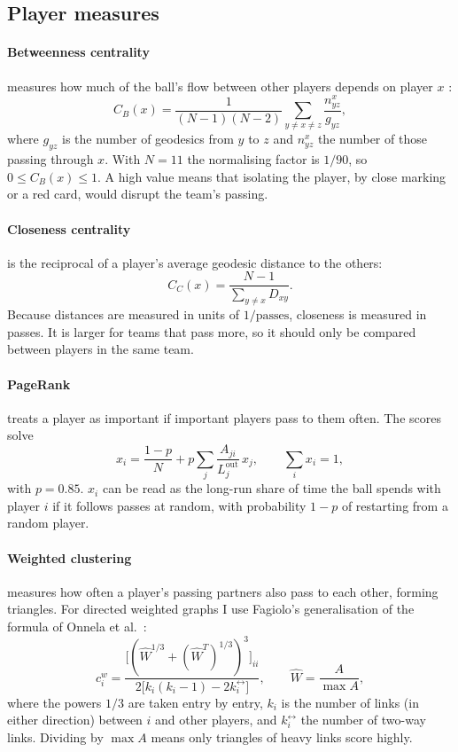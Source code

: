 \documentclass[11pt,a4paper]{article}
\begin{document}
\subsection{Player measures}\label{sec:measures}

\paragraph{Betweenness centrality} measures how much of the ball's flow between other players depends on player $x$ \cite{freeman, brandes}:
\[
C_B(x) = \frac{1}{(N-1)(N-2)} \sum_{y \ne x \ne z} \frac{n^x_{yz}}{g_{yz}},
\]
where $g_{yz}$ is the number of geodesics from $y$ to $z$ and $n^x_{yz}$ the number of those passing through $x$. With $N = 11$ the normalising factor is $1/90$, so $0 \le C_B(x) \le 1$. A high value means that isolating the player, by close marking or a red card, would disrupt the team's passing.

\paragraph{Closeness centrality} is the reciprocal of a player's average geodesic distance to the others:
\[
C_C(x) = \frac{N-1}{\sum_{y \ne x} D_{xy}} .
\]
Because distances are measured in units of $1/\text{passes}$, closeness is measured in passes. It is larger for teams that pass more, so it should only be compared between players in the same team.

\paragraph{PageRank} \cite{brin} treats a player as important if important players pass to them often. The scores solve
\[
x_i = \frac{1-p}{N} + p \sum_{j} \frac{A_{ji}}{L^{\text{out}}_j}\, x_j , \qquad \sum_i x_i = 1,
\]
with $p = 0.85$. $x_i$ can be read as the long-run share of time the ball spends with player $i$ if it follows passes at random, with probability $1-p$ of restarting from a random player.

\paragraph{Weighted clustering} measures how often a player's passing partners also pass to each other, forming triangles. For directed weighted graphs I use Fagiolo's generalisation \cite{fagiolo} of the formula of Onnela et al.\ \cite{onnela}:
\[
c^w_i = \frac{\big[(\hat W^{1/3} + (\hat W^{T})^{1/3})^3\big]_{ii}}{2\big[k_i(k_i-1) - 2k^{\leftrightarrow}_i\big]}, \qquad \hat W = \frac{A}{\max A},
\]
where the powers $1/3$ are taken entry by entry, $k_i$ is the number of links (in either direction) between $i$ and other players, and $k^{\leftrightarrow}_i$ the number of two-way links. Dividing by $\max A$ means only triangles of heavy links score highly.
\end{document}
